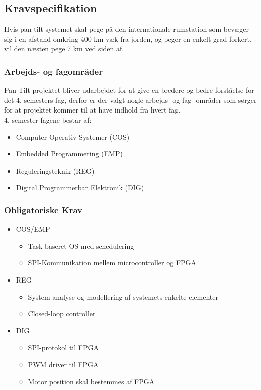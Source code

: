 
\subsection{Kravspecifikation}

Hvis pan-tilt systemet skal pege på den internationale rumstation som bevæger sig i en afstand omkring 400 km væk fra jorden, og peger en enkelt grad forkert, vil den næsten pege 7 km ved siden af.

\subsubsection{Arbejds- og fagområder}
Pan-Tilt projektet bliver udarbejdet for at give en bredere og bedre forståelse for det 4. semesters fag, derfor er der valgt nogle arbejds- og fag- områder som sørger for at projektet kommer til at have indhold fra hvert fag.\\
4. semester fagene består af:
\begin{itemize}[noitemsep]
	\item Computer Operativ Systemer (COS)
	\item Embedded Programmering (EMP)
	\item Reguleringsteknik (REG)
	\item Digital Programmerbar Elektronik (DIG)
\end{itemize}

\subsubsection{Obligatoriske Krav}

\begin{itemize}[noitemsep]
	\item COS/EMP
	\begin{itemize}[noitemsep]
		\item Task-baseret OS med schedulering
		\item SPI-Kommunikation mellem microcontroller og FPGA
	\end{itemize}
	\item REG
	\begin{itemize}[noitemsep]
		\item System analyse og modellering af systemets enkelte elementer
		\item Closed-loop controller
	\end{itemize}
	\item DIG
	\begin{itemize}[noitemsep]
		\item SPI-protokol til FPGA
		\item PWM driver til FPGA
		\item Motor position skal bestemmes af FPGA
	\end{itemize}
\end{itemize}

